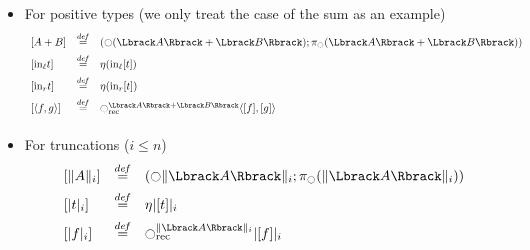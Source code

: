 \documentclass{beamer}
\newcommand \defeq {\overset{de\hspace{-0.2ex}f}{=}}
\newcommand{\modal}{\ensuremath{\ocircle}}
\begin{document}
\begin{frame}[allowframebreaks]
\begin{itemize}
  \item For positive types (we only treat the case of the sum as an example)
    \[
    \begin{array}{lcl}
      \left[  A+B \right] &\defeq& \left( \modal(\Lbrack A \Rbrack + \Lbrack B
        \Rbrack); \pi_\modal(\Lbrack A \Rbrack + \Lbrack B
        \Rbrack)\right)\\[0.5em]
      \left[  \mathrm{in}_\ell t \right] &\defeq& \eta (\mathrm{in}_\ell [t]) \\[0.5em]
      \left[  \mathrm{in}_r t \right] &\defeq& \eta (\mathrm{in}_r [t]) \\[0.5em]
      \left[ \langle f ,g\rangle\right] &\defeq& \modal_{\mathrm{rec}}^{\Lbrack A\Rbrack +
        \Lbrack B\Rbrack} \langle
      [f],[g]\rangle\\[0.5em]
    \end{array}
    \]
  \item For truncations ($i\leqslant n$)
    \[
    \begin{array}{lcl}
      \left[  \|A\|_i \right] &\defeq& (\modal \| \Lbrack A\Rbrack  \|_i;
      \pi_\modal(\| \Lbrack A\Rbrack
      \|_i)) \\[0.5em]
      \left[ |t|_i \right] &\defeq& \eta |[t]|_i \\[0.5em]
      \left[ |f|_i \right] &\defeq& \modal_{\mathrm{rec}}^{\| \Lbrack
        A\Rbrack  \|_i} | [f] |_i
    \end{array}
    \]

  \end{itemize}
\end{frame}
\end{document}
